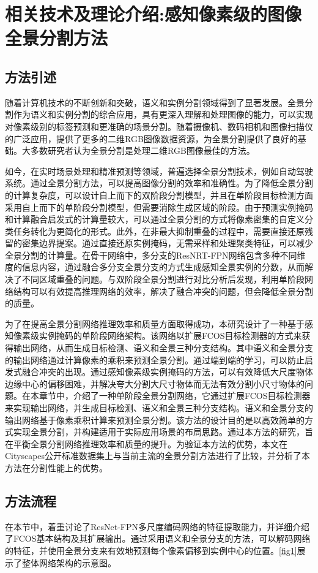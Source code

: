 \chapter{相关技术及理论介绍:感知像素级的图像全景分割方法}
\section{方法引述}
随着计算机技术的不断创新和突破，语义和实例分割领域得到了显著发展。全景分割作为语义和实例分割的综合应用，具有更深入理解和处理图像的能力，可以实现对像素级别的标签预测和更准确的场景分割。随着摄像机、数码相机和图像扫描仪的广泛应用，提供了更多的二维RGB图像数据资源，为全景分割提供了良好的基础。大多数研究者认为全景分割是处理二维RGB图像最佳的方法。

如今，在实时场景处理和精准预测等领域，普遍选择全景分割技术，例如自动驾驶系统。通过全景分割方法，可以提高图像分割的效率和准确性。为了降低全景分割的计算复杂度，可以设计自上而下的双阶段分割模型，并且在单阶段目标检测方面采用自上而下的单阶段分割模型，但需要消除生成区域的阶段。由于预测实例掩码和计算融合启发式的计算量较大，可以通过全景分割的方式将像素密集的自定义分类任务转化为更简化的形式。此外，在非最大抑制重叠的过程中，需要直接还原残留的密集边界提案。通过直接还原实例掩码，无需采样和处理聚类特征，可以减少全景分割的计算量。在骨干网络中，多分支的ResNRT-FPN网络包含多种不同维度的信息内容，通过融合多分支全景分支的方式生成感知全景实例的分数，从而解决了不同区域重叠的问题。与双阶段全景分割进行对比分析后发现，利用单阶段网络结构可以有效提高推理网络的效率，解决了融合冲突的问题，但会降低全景分割的质量。

为了在提高全景分割网络推理效率和质量方面取得成功，本研究设计了一种基于感知像素级实例掩码的单阶段网络架构。该网络以扩展FCOS目标检测器的方式来获得输出网络，从而生成目标检测、语义和全景三种分支结构。其中语义和全景分支的输出网络通过计算像素的乘积来预测全景分割。通过端到端的学习，可以防止启发式融合冲突的出现。通过感知像素级实例掩码的方法，可以有效降低大尺度物体边缘中心的偏移困难，并解决夸大分割大尺寸物体而无法有效分割小尺寸物体的问题。在本章节中，介绍了一种单阶段全景分割网络，它通过扩展FCOS目标检测器来实现输出网络，并生成目标检测、语义和全景三种分支结构。语义和全景分支的输出网络基于像素乘积计算来预测全景分割。该方法的设计目的是以高效简单的方式实现全景分割，并构建适用于实际应用场景的布局思路。通过本方法的研究，旨在平衡全景分割网络推理效率和质量的提升。为验证本方法的优势，本文在Cityscapes公开标准数据集上与当前主流的全景分割方法进行了比较，并分析了本方法在分割性能上的优势。

\section{方法流程}
在本节中，着重讨论了ResNet-FPN多尺度编码网络的特征提取能力，并详细介绍了FCOS基本结构及其扩展输出。通过采用语义和全景分支的方法，可以解码网络的特征，并使用全景分支来有效地预测每个像素偏移到实例中心的位置\cite{li2017fully}。\cref*{fig1}展示了整体网络架构的示意图。

